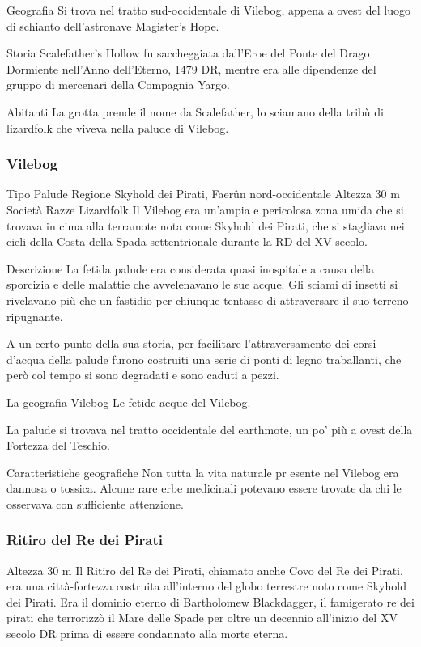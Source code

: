 \documentclass{article}
\begin{document}
Geografia\newline
Si trova nel tratto sud-occidentale di Vilebog, appena a ovest del luogo di schianto dell'astronave Magister's Hope.

Storia\newline
Scalefather's Hollow fu saccheggiata dall'Eroe del Ponte del Drago Dormiente nell'Anno dell'Eterno, 1479 DR, mentre era alle dipendenze del gruppo di mercenari della Compagnia Yargo.

Abitanti\newline
La grotta prende il nome da Scalefather, lo sciamano della tribù di lizardfolk che viveva nella palude di Vilebog.
              \subsubsection{Vilebog}
Tipo
Palude
Regione
Skyhold dei Pirati, Faerûn nord-occidentale
Altezza
30 m
Società
Razze
Lizardfolk
Il Vilebog era un'ampia e pericolosa zona umida che si trovava in cima alla terramote nota come Skyhold dei Pirati, che si stagliava nei cieli della Costa della Spada settentrionale durante la RD del XV secolo.

Descrizione
La fetida palude era considerata quasi inospitale a causa della sporcizia e delle malattie che avvelenavano le sue acque. Gli sciami di insetti si rivelavano più che un fastidio per chiunque tentasse di attraversare il suo terreno ripugnante.

A un certo punto della sua storia, per facilitare l'attraversamento dei corsi d'acqua della palude furono costruiti una serie di ponti di legno traballanti, che però col tempo si sono degradati e sono caduti a pezzi.

La geografia
Vilebog
Le fetide acque del Vilebog.

La palude si trovava nel tratto occidentale del earthmote, un po' più a ovest della Fortezza del Teschio.

Caratteristiche geografiche
Non tutta la vita naturale pr
esente nel Vilebog era dannosa o tossica. Alcune rare erbe medicinali potevano essere trovate da chi le osservava con sufficiente attenzione.
              \subsubsection{Ritiro del Re dei Pirati}
Altezza
30 m
Il Ritiro del Re dei Pirati, chiamato anche Covo del Re dei Pirati, era una città-fortezza costruita all'interno del globo terrestre noto come Skyhold dei Pirati. Era il dominio eterno di Bartholomew Blackdagger, il famigerato re dei pirati che terrorizzò il Mare delle Spade per oltre un decennio all'inizio del XV secolo DR prima di essere condannato alla morte eterna.
\end{document}
